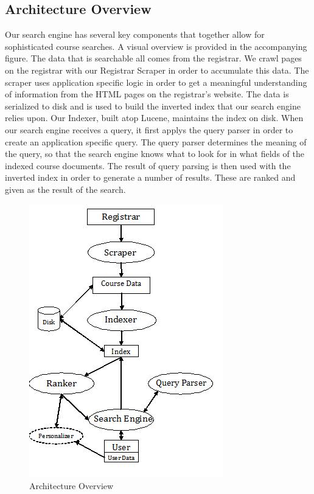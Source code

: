 \documentclass[12pt,letterpaper]{article}
\begin{document}
\subsection{Architecture Overview}
Our search engine has several key components that together allow for sophisticated course searches. A visual overview is provided in the accompanying figure. The data that is searchable all comes from the registrar. We crawl pages on the registrar with our Registrar Scraper in order to accumulate this data. The scraper uses application specific logic in order to get a meaningful understanding of information from the HTML pages on the registrar's website. The data is serialized to disk and is used to build the inverted index that our search engine relies upon. Our Indexer, built atop Lucene, maintains the index on disk. When our search engine receives a query, it first applys the query parser in order to create an application specific query. The query parser determines the meaning of the query, so that the search engine knows what to look for in what fields of the indexed course documents. The result of query parsing is then used with the inverted index in order to generate a number of results. These are ranked and given as the result of the search.

\begin{figure}
\begin{center}
\includegraphics{OverallArchDiagram.png}
\end{center}
\caption{Architecture Overview}
\end{figure}
\end{document}
